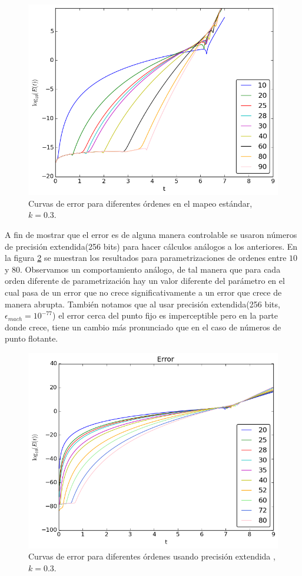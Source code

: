 \begin{figure}[H]
\centering
\includegraphics[scale=0.6]{error_estandar_orden}
\caption{Curvas de error para diferentes órdenes en el mapeo estándar, $k=0.3$. }
\label{erroresf64}
\end{figure}
A fin de mostrar que el error es de alguna manera controlable se usaron números de precisión extendida(256 bits) para hacer cálculos análogos a los anteriores. En la figura \ref{erroresBig} se muestran los resultados para parametrizaciones de ordenes entre $10$ y $80$. Observamos un comportamiento análogo, de tal manera que para cada orden diferente de parametrización hay un valor diferente del parámetro en el cual pasa de un error que no crece significativamente a un error que crece de manera abrupta. También notamos que al usar precisión extendida(256 bits, $\epsilon_{mach}=10^{-77}$) el error cerca del punto fijo es imperceptible pero en la parte donde crece, tiene un cambio más pronunciado que en el caso de números de punto flotante. 

\begin{figure}[H]
\centering
\includegraphics[scale=0.6]{error_estandar_orden_big}
\caption{Curvas de error para diferentes órdenes usando precisión extendida ,$k=0.3$. }
\label{erroresBig}
\end{figure}

